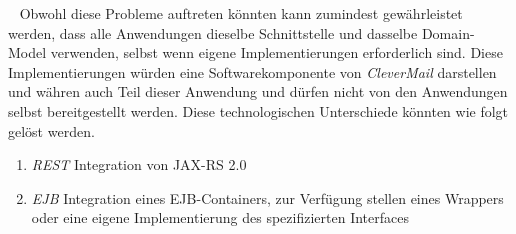 \ \newline
Obwohl diese Probleme auftreten könnten kann zumindest gewährleistet werden, dass alle Anwendungen dieselbe Schnittstelle und dasselbe Domain-Model verwenden, selbst wenn eigene Implementierungen erforderlich sind. Diese Implementierungen würden eine Softwarekomponente von \emph{CleverMail} darstellen und währen auch Teil dieser Anwendung und dürfen nicht von den Anwendungen selbst bereitgestellt werden.
Diese technologischen Unterschiede könnten wie folgt gelöst werden.
\begin{enumerate}
	\item\emph{REST}
	\newline
	Integration von JAX-RS 2.0 
	\item\emph{EJB}
	\newline
	Integration eines EJB-Containers, zur Verfügung stellen eines Wrappers oder eine eigene Implementierung des spezifizierten Interfaces
\end{enumerate}
